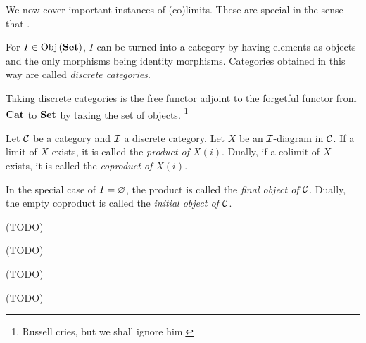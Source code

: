 \begin{rmk}
  We now cover important instances of (co)limits.
  These are special in the sense that 
  . 
\end{rmk}

\begin{dfn}
  
  For $I \in \mathrm{Obj}\left(\mathbf{Set}\right)$, 
  $I$ can be turned into a category by having elements as objects 
  and the only morphisms being identity morphisms. 
  Categories obtained in this way are called \emph{discrete categories}.
\end{dfn}

\begin{rmk}
  Taking discrete categories is the free functor adjoint to 
  the forgetful functor from $\mathbf{Cat}$ to $\mathbf{Set}$ by taking the set of objects.
  \footnote{
    Russell cries, but we shall ignore him. 
  }
\end{rmk}

\begin{dfn}[(Co)Products]
  
  Let $\mathcal{C}$ be a category and $\mathcal{I}$ a discrete category.
  Let $X$ be an $\mathcal{I}$-diagram in $\mathcal{C}$.
  If a limit of $X$ exists,
  it is called the \emph{product of $X(i)$}.
  Dually, if a colimit of $X$ exists,
  it is called the \emph{coproduct of $X(i)$}.

  In the special case of $I = \varnothing$, 
  the product is called the \emph{final object of $\mathcal{C}$}.
  Dually, the empty coproduct is called the \emph{initial object of $\mathcal{C}$}.
\end{dfn}

\begin{eg}
  
  (TODO)
\end{eg}

\begin{eg}
  
  (TODO)
\end{eg}

\begin{eg}[Products]
  
  (TODO)
\end{eg}

\begin{eg}[Coproducts]
  
  (TODO)
\end{eg}

